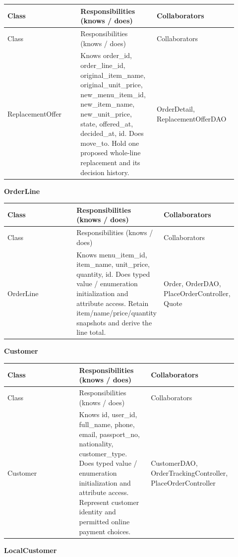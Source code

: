 \begin{longtable}{>{\raggedright\arraybackslash}p{0.3067\linewidth}>{\raggedright\arraybackslash}p{0.3067\linewidth}>{\raggedright\arraybackslash}p{0.3067\linewidth}}
Class & Responsibilities (knows / does) & Collaborators \\
\hline\endfirsthead
Class & Responsibilities (knows / does) & Collaborators \\
\hline\endhead
ReplacementOffer & Knows order\_id, order\_line\_id, original\_item\_name, original\_unit\_price, new\_menu\_item\_id, new\_item\_name, new\_unit\_price, state, offered\_at, decided\_at, id. Does move\_to. Hold one proposed whole-line replacement and its decision history. & OrderDetail, ReplacementOfferDAO \\
\end{longtable}
\textbf{OrderLine}

\begin{longtable}{>{\raggedright\arraybackslash}p{0.3067\linewidth}>{\raggedright\arraybackslash}p{0.3067\linewidth}>{\raggedright\arraybackslash}p{0.3067\linewidth}}
Class & Responsibilities (knows / does) & Collaborators \\
\hline\endfirsthead
Class & Responsibilities (knows / does) & Collaborators \\
\hline\endhead
OrderLine & Knows menu\_item\_id, item\_name, unit\_price, quantity, id. Does typed value / enumeration initialization and attribute access. Retain item/name/price/quantity snapshots and derive the line total. & Order, OrderDAO, PlaceOrderController, Quote \\
\end{longtable}
\textbf{Customer}

\begin{longtable}{>{\raggedright\arraybackslash}p{0.3067\linewidth}>{\raggedright\arraybackslash}p{0.3067\linewidth}>{\raggedright\arraybackslash}p{0.3067\linewidth}}
Class & Responsibilities (knows / does) & Collaborators \\
\hline\endfirsthead
Class & Responsibilities (knows / does) & Collaborators \\
\hline\endhead
Customer & Knows id, user\_id, full\_name, phone, email, passport\_no, nationality, customer\_type. Does typed value / enumeration initialization and attribute access. Represent customer identity and permitted online payment choices. & CustomerDAO, OrderTrackingController, PlaceOrderController \\
\end{longtable}
\textbf{LocalCustomer}

